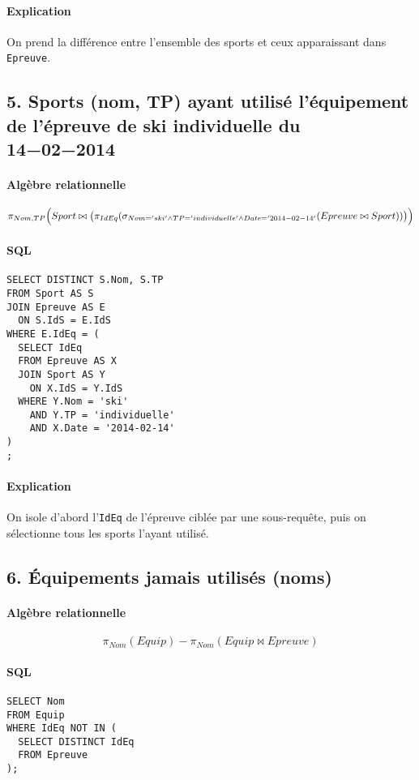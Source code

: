 \documentclass[a4paper,12pt]{article}
\begin{document}
\paragraph{Explication}
On prend la différence entre l'ensemble des sports et ceux apparaissant dans \texttt{Epreuve}.

\subsection*{5. Sports (nom, TP) ayant utilisé l'équipement de l'épreuve de ski individuelle du \num{14-02-2014}}
\paragraph{Algèbre relationnelle}
\[
  \pi_{Nom,TP}\Bigl(
    Sport \bowtie \\
    \bigl(\pi_{IdEq}(\sigma_{Nom='ski' \wedge TP='individuelle' \wedge Date='2014-02-14'}(Epreuve \bowtie Sport))\bigr)
  \Bigr)
\]
\paragraph{SQL}
\begin{verbatim}
SELECT DISTINCT S.Nom, S.TP
FROM Sport AS S
JOIN Epreuve AS E
  ON S.IdS = E.IdS
WHERE E.IdEq = (
  SELECT IdEq
  FROM Epreuve AS X
  JOIN Sport AS Y
    ON X.IdS = Y.IdS
  WHERE Y.Nom = 'ski'
    AND Y.TP = 'individuelle'
    AND X.Date = '2014-02-14'
)
;
\end{verbatim}
\paragraph{Explication}
On isole d'abord l'\texttt{IdEq} de l'épreuve ciblée par une sous-requête, puis on sélectionne tous les sports l'ayant utilisé.

\subsection*{6. Équipements jamais utilisés (noms)}
\paragraph{Algèbre relationnelle}
\[
  \pi_{Nom}(Equip) - \pi_{Nom}(Equip \bowtie Epreuve)
\]
\paragraph{SQL}
\begin{verbatim}
SELECT Nom
FROM Equip
WHERE IdEq NOT IN (
  SELECT DISTINCT IdEq
  FROM Epreuve
);
\end{verbatim}
\end{document}
